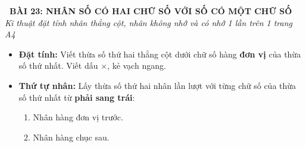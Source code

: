 \documentclass[12pt,a4paper]{article}
\begin{document}
\begin{tcolorbox}[
  enhanced,
  colback=teal!8!white,
  colframe=teal!70!black,
  arc=3mm, boxrule=1.2pt,
  left=3mm, right=3mm, top=2mm, bottom=2mm,
  halign=center
]
  {\LARGE\bfseries\color{teal!90!black}\faBookmark\ BÀI 23: NHÂN SỐ CÓ HAI CHỮ SỐ VỚI SỐ CÓ MỘT CHỮ SỐ}\\[1mm]
  {\itshape\footnotesize\color{black!75} Kĩ thuật đặt tính nhân thẳng cột, nhân không nhớ và có nhớ 1 lần trên 1 trang A4}
\end{tcolorbox}

\vspace{-2mm}

\noindent
\begin{minipage}[t]{0.49\textwidth}\vspace{0pt}
\begin{tcolorbox}[
  enhanced,
  colback=blue!4!white,
  colframe=blue!75!black,
  arc=2mm, boxrule=0.8pt,
  left=2mm, right=2mm, top=1.8mm, bottom=1.8mm,
  title={\footnotesize\bfseries\color{white}\faTimes\ 1. Quy trình Đặt tính rồi tính}
]
{\footnotesize
\begin{itemize}\setlength{\itemsep}{1pt}\setlength{\leftskip}{-2.5mm}
  \item \textbf{Đặt tính:} Viết thừa số thứ hai thẳng cột dưới chữ số hàng \textbf{đơn vị} của thừa số thứ nhất. Viết dấu $\times$, kẻ vạch ngang.
  \item \textbf{Thứ tự nhân:} Lấy thừa số thứ hai nhân lần lượt với từng chữ số của thừa số thứ nhất từ \textbf{phải sang trái}:
  \begin{enumerate}\setlength{\itemsep}{0.5pt}\setlength{\leftskip}{-2.5mm}
    \item Nhân hàng đơn vị trước.
    \item Nhân hàng chục sau.
  \end{enumerate}
\end{itemize}
}
\end{tcolorbox}
\end{minipage}
\hfill
\end{document}
